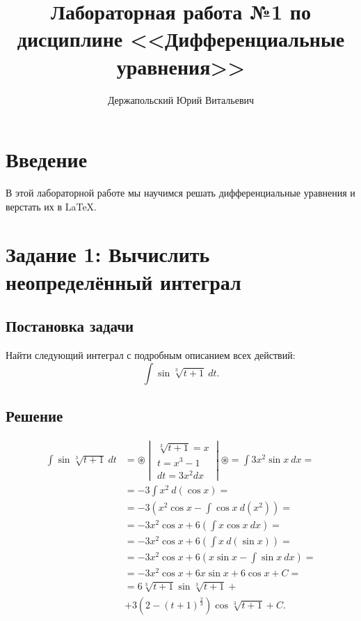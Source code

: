 \documentclass[14pt, a4paper, titlepage, fleqn]{extarticle}
\title{Лабораторная работа №1 по дисциплине <<Дифференциальные уравнения>>}
\author{Держапольский Юрий Витальевич}
\begin{document}
    \maketitle

    \tableofcontents

    \pagebreak

    \section{Введение}
        В этой лабораторной работе мы научимся решать дифференциальные
        уравнения и верстать их в \LaTeX.

    \pagebreak

    \section{Задание 1: Вычислить неопределённый интеграл}
        \subsection{Постановка задачи}
            Найти следующий интеграл с подробным описанием всех действий:
            \[ \int \sin{ \sqrt[3]{t+1} } ~ dt. \]
        
        \subsection{Решение}
        \[
            \begin{split}
                \int \sin{ \sqrt[3]{t+1} } ~ dt &= \circledast
                \begin{vmatrix}
                    \sqrt[3]{t+1} = x \\
                    t = x^3 - 1 \\
                    dt = 3x^2dx 
                \end{vmatrix}
                \circledast = \int 3x^2\sin{x} ~ dx = \\
                &= -3 \int x^2 ~ d(\cos{x}) = \\
                &= -3 \left( 
                    x^2\cos{x} - \int \cos{x} ~ d \left(x^2\right) 
                \right) = \\
                &= -3x^2\cos{x} + 6\left(\int x \cos{x} ~ dx\right) = \\
                &= -3x^2\cos{x} + 6\left(\int x ~ d(\sin{x})\right) = \\
                &= -3x^2\cos{x} + 6\left(x\sin{x} - \int \sin{x} ~ dx \right)=\\
                &= -3x^2\cos{x} + 6x\sin{x} + 6\cos{x} + C =\\
                &= 6 \sqrt[3]{t+1} \sin{\sqrt[3]{t+1}} + \\
                &+ 3\left(2 - (t+1)^{\frac{2}{3}}\right) \cos{\sqrt[3]{t+1}}+C.
            \end{split}    
        \]
\end{document}
